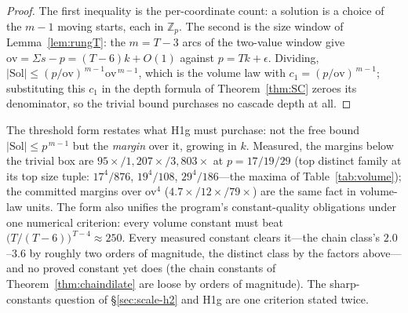 \documentclass[11pt,a4paper]{article}
\numberwithin{equation}{section}
\theoremstyle{plain}
\theoremstyle{definition}
\theoremstyle{remark}
\newcommand{\Z}{\mathbb{Z}}
\begin{document}
\begin{proof}
The first inequality is the per-coordinate count: a solution is a
choice of the $m-1$ moving starts, each in $\Z_p$. The second is the
size window of Lemma~\ref{lem:rungT}: the $m=T-3$ arcs of the
two-value window give $\mathrm{ov}=\Sigma s-p=(T-6)k+O(1)$ against
$p=Tk+\epsilon$. Dividing,
$|\mathrm{Sol}|\le(p/\mathrm{ov})^{\,m-1}\mathrm{ov}^{\,m-1}$, which is
the volume law with $c_1=(p/\mathrm{ov})^{\,m-1}$; substituting this
$c_1$ in the depth formula of Theorem~\ref{thm:SC} zeroes its
denominator, so the trivial bound purchases no cascade depth at all.
\end{proof}

The threshold form restates what H1g must purchase: not the free
bound $|\mathrm{Sol}|\le p^{\,m-1}$ but the \emph{margin} over it,
growing in $k$. Measured, the margins below the trivial box are
$95\times/1{,}207\times/3{,}803\times$ at $p=17/19/29$ (top distinct
family at its top size tuple: $17^{4}/876$, $19^{4}/108$,
$29^{4}/186$---the maxima of Table~\ref{tab:volume}); the committed
margins over $\mathrm{ov}^{4}$ ($4.7\times/12\times/79\times$) are
the same fact in volume-law units. The form also unifies the program's
constant-quality obligations under one numerical criterion: every
volume constant must beat $\bigl(T/(T-6)\bigr)^{\,T-4}\approx250$.
Every measured constant clears it---the chain class's
$2.0$--$3.6$ by roughly two orders of magnitude, the distinct class by
the factors above---and no proved constant yet does (the chain
constants of Theorem~\ref{thm:chaindilate} are loose by orders of
magnitude). The sharp-constants question of \S\ref{sec:scale-h2} and
H1g are one criterion stated twice.
\end{document}
